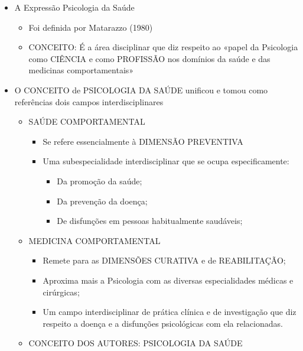 \documentclass[
]{book}
\providecommand{\tightlist}{%
  \setlength{\itemsep}{0pt}\setlength{\parskip}{0pt}}
\begin{document}
\begin{itemize}
\tightlist
\item
  A Expressão Psicologia da Saúde

  \begin{itemize}
  \tightlist
  \item
    Foi definida por Matarazzo (1980)
  \item
    CONCEITO: É a área disciplinar que diz respeito ao «papel da Psicologia como CIÊNCIA e como PROFISSÃO nos domínios da saúde e das medicinas comportamentais»
  \end{itemize}
\item
  O CONCEITO de PSICOLOGIA DA SAÚDE unificou e tomou como referências dois campos interdisciplinares

  \begin{itemize}
  \tightlist
  \item
    SAÚDE COMPORTAMENTAL

    \begin{itemize}
    \tightlist
    \item
      Se refere essencialmente à DIMENSÃO PREVENTIVA
    \item
      Uma subespecialidade interdisciplinar que se ocupa especificamente:

      \begin{itemize}
      \tightlist
      \item
        Da promoção da saúde;
      \item
        Da prevenção da doença;
      \item
        De disfunções em pessoas habitualmente saudáveis;
      \end{itemize}
    \end{itemize}
  \item
    MEDICINA COMPORTAMENTAL

    \begin{itemize}
    \tightlist
    \item
      Remete para as DIMENSÕES CURATIVA e de REABILITAÇÃO;
    \item
      Aproxima mais a Psicologia com as diversas especialidades médicas e cirúrgicas;
    \item
      Um campo interdisciplinar de prática clínica e de investigação que diz respeito a doença e a disfunções psicológicas com ela relacionadas.
    \end{itemize}
  \item
    CONCEITO DOS AUTORES: PSICOLOGIA DA SAÚDE


\end{itemize}
\end{itemize}
\end{document}

